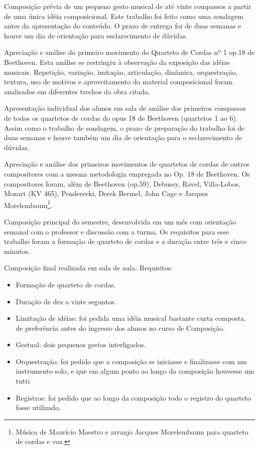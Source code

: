 \documentclass{article}
\begin{document}

Composição prévia de um pequeno gesto musical de até vinte compassos a
partir de uma única idéia composicional. Este trabalho foi feito como
uma sondagem antes da apresentação do conteúdo. O prazo de entrega foi
de duas semanas e houve um dia de orientação para esclarecimento de
dúvidas.

Apreciação e análise do primeiro movimento do Quarteto de Cordas nº 1
op.18 de Beethoven. Esta análise se restringiu à observação da
exposição das idéias musicais. Repetição, variação, imitação,
articulação, dinâmica, orquestração, textura, uso de motivos e
aproveitamento do material composicional foram analisados em
diferentes trechos da obra citada.

Apresentação individual dos alunos em sala de análise dos primeiros
compassos de todos os quartetos de cordas do opus 18 de Beethoven
(quartetos 1 ao 6). Assim como o trabalho de sondagem, o prazo de
preparação do trabalho foi de duas semanas e houve também um dia de
orientação para o esclarecimento de dúvidas.

Apreciação e análise dos primeiros movimentos de quartetos de cordas
de outros compositores com a mesma metodologia empregada no Op. 18 de
Beethoven. Os compositores foram, além de Beethoven (op.59), Debussy,
Ravel, Villa-Lobos, Mozart (KV 465), Penderecki, Derek Bermel, John
Cage e Jacques Morelembaum\footnote{Música de Maurício Maestro e
  arranjo Jacques Morelembaum para quarteto de cordas e voz.}.

Composição principal do semestre, desenvolvida em um mês com
orientação semanal com o professor e discussão com a turma. Os
requisitos para esse trabalho foram a formação de quarteto de cordas e
a duração entre três e cinco minutos.

Composição final realizada em sala de aula. Requisitos:
\begin{itemize}
\item Formação de quarteto de cordas.
\item Duração de dez a vinte seguntos.
\item Limitação de idéias: foi pedida uma idéia musical bastante curta
  composta, de preferência antes do ingresso dos alunos no curso de
  Composição.
\item Gestual: dois pequenos gestos interligados.
\item Orquestração: foi pedido que a composição se iniciasse e
  finalizasse com um instrumento solo, e que em algum ponto ao longo
  da composição houvesse um tutti
\item Registros: foi pedido que ao longo da composição todo o registro
  do quarteto fosse utilizado.
\end{itemize}
\end{document}
